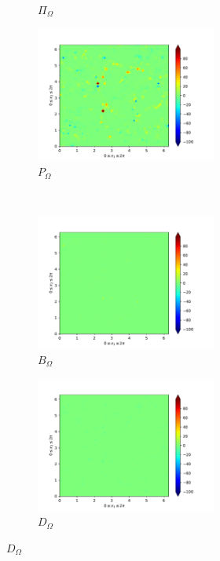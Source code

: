\begin{figure}[H]
\begin{subfigure}{0.45\textwidth}
        \caption{$\Pi_{\Omega}$}
    \end{subfigure}
    \newline
    \begin{subfigure}{0.45\textwidth}
        \includegraphics[height=1.75in]{media/run-cds-65/P-enst-1310}
        \caption{$P_{\Omega}$}
    \end{subfigure}
    ~
    \begin{subfigure}{0.45\textwidth}
        \includegraphics[height=1.75in]{media/run-cds-65/B-enst-1310}
        \caption{$B_{\Omega}$}
    \end{subfigure}
    \newline
    \begin{subfigure}{0.45\textwidth}
        \includegraphics[height=1.75in]{media/run-cds-65/D-enst-1310}
        \caption{$D_{\Omega}$}
    \end{subfigure}
\end{figure}

\newpage

